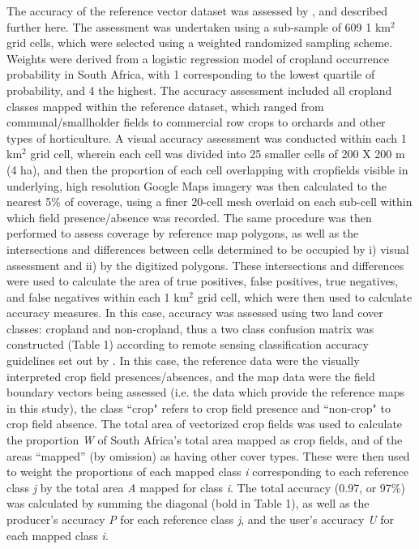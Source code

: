 \documentclass[12pt, titlepage]{article}
\begin{document}
The accuracy of the reference vector dataset was assessed by \citet{estes_platform_2016}, and described further here. The assessment was undertaken using a sub-sample of 609 1 km$^2$ grid cells, which were selected using a weighted randomized sampling scheme. Weights were derived from a logistic regression model of cropland occurrence probability in South Africa, with 1 corresponding to the lowest quartile of probability, and 4 the highest. The accuracy assessment included all cropland classes mapped within the reference dataset, which ranged from communal/smallholder fields to commercial row crops to orchards and other types of horticulture. A visual accuracy assessment was conducted within each 1 km$^2$ grid cell, wherein each cell was divided into 25 smaller cells of 200 X 200 m (4 ha), and then the proportion of each cell overlapping with cropfields visible in underlying, high resolution Google Maps imagery was then calculated to the nearest 5\% of coverage, using a finer 20-cell mesh overlaid on each sub-cell within which field presence/absence was recorded. The same procedure was then performed to assess coverage by reference map polygons, as well as the intersections and differences between cells determined to be occupied by i) visual assessment and ii) by the digitized polygons. These intersections and differences were used to calculate the area of true positives, false positives, true negatives, and false negatives within each 1 km$^2$ grid cell, which were then used to calculate accuracy measures.  In this case, accuracy was assessed using two land cover classes: cropland and non-cropland, thus a two class confusion matrix was constructed (Table 1) according to remote sensing classification accuracy guidelines set out by \citet{olofsson_good_2014}. In this case, the reference data were the visually interpreted crop field presences/absences, and the map data were the field boundary vectors being assessed (i.e. the data which provide the reference maps in this study), the class ``crop" refers to crop field presence and ``non-crop" to crop field absence.  The total area of vectorized crop fields was used to calculate the proportion \emph{W} of South Africa's total area mapped as crop fields, and of the areas ``mapped'' (by omission) as having other cover types.  These were then used to weight the proportions of each mapped class \emph{i} corresponding to each reference class \emph{j} by the total area \emph{A} mapped for class \emph{i}. The total accuracy (0.97, or 97\%) was calculated by summing the diagonal (bold in Table 1), as well as the producer's accuracy \emph{P} for each reference class \emph{j}, and the user's accuracy \emph{U} for each mapped class \emph{i}.  
\end{document}
